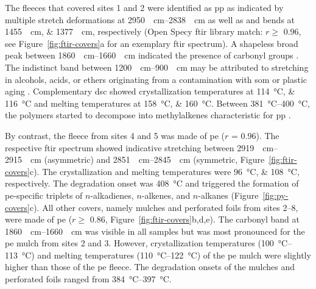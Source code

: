 The fleeces that covered sites 1 and 2 were identified as \ac{pp} as indicated by multiple  stretch deformations at \SIrange{2950}{2838}{\per\centi\meter} as well as  and  bends at \SIlist{1455;1377}{\per\centi\meter}, respectively (Open Specy \ac{ftir} library match: $r \geq$ \num{0.96}, see Figure~\ref{fig:ftir-covers}a for an exemplary \ac{ftir} spectrum). A shapeless broad peak between \SIrange[range-phrase={ and }]{1860}{1660}{\per\centi\meter} indicated the presence of carbonyl groups \citep{GrauseChanges2020}. The indistinct band between \SIrange[range-phrase={ and }]{1200}{900}{\per\centi\meter} may be attributed to  stretching in alcohols, acids, or ethers originating from a contamination with \ac{som} or plastic aging \citep{FuMechanism2021}. Complementary \ac{dsc} showed crystallization temperatures at \SIlist{114;116}{\degreeCelsius} and melting temperatures at \SIlist{158;160}{\degreeCelsius}. Between \SIrange[range-phrase={ and }]{381}{400}{\degreeCelsius}, the polymers started to decompose into methylalkenes characteristic for \ac{pp} \citep[Figure~\ref{fig:py-covers}a for an exemplary pyrogram]{TsugePyrolysis2011}.

By contrast, the fleece from sites 4 and 5 was made of \ac{pe} ($r$ = \num{0.96}). The respective \ac{ftir} spectrum showed indicative  stretching between \SIrange{2919}{2915}{\per\centi\meter} (asymmetric)
and \SIrange{2851}{2845}{\per\centi\meter} (symmetric, Figure~\ref{fig:ftir-covers}c). The crystallization and melting temperatures were \SIlist{96;108}{\degreeCelsius}, respectively. The degradation onset was \SI{408}{\degreeCelsius} and triggered the formation of \ac{pe}-specific triplets of $n$-alkadienes, $n$-alkenes, and $n$-alkanes (Figure~\ref{fig:py-covers}c).
All other covers, namely mulches and perforated foils from sites 2--8, were made of \ac{pe} ($r \geq$ 0.86, Figure~\ref{fig:ftir-covers}b,d,e). The carbonyl band at \SIrange{1860}{1660}{\per\centi\meter} was visible in all samples but was most pronounced for the \ac{pe} mulch from sites 2 and 3. However, crystallization temperatures (\SIrange{100}{113}{\degreeCelsius}) and melting temperatures (\SIrange{110}{122}{\degreeCelsius}) of the \ac{pe} mulch were slightly higher than those of the \ac{pe} fleece. The degradation onsets of the mulches and perforated foils ranged from \SIrange[range-phrase={ to }]{384}{397}{\degreeCelsius}.

